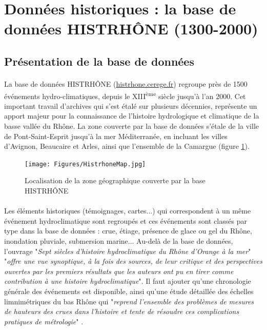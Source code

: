 \documentclass[11pt]{article}
\begin{document}
\FloatBarrier

\section{Données historiques : la base de données HISTRHÔNE (1300-2000)}
\label{sec:HISTRHONE}
	\subsection{Présentation de la base de données}

	\paragraph{} La base de données HISTRHÔNE (\url{histrhone.cerege.fr}) \citep{pichard_sept_2014} regroupe près de 1500 événements hydro-climatiques, depuis le XIII\textsuperscript{ème} siècle jusqu'à l'an 2000. Cet important travail d'archives qui s'est étalé sur plusieurs décennies, représente un apport majeur pour la connaissance de l'histoire hydrologique et climatique de la basse vallée du Rhône. La zone couverte par la base de données s'étale de la ville de Pont-Saint-Esprit jusqu'à la mer Méditerranée, en incluant les villes d'Avignon, Beaucaire et Arles, ainsi que l'ensemble de la Camargue (figure \ref{fig:MapHistrhone}). 
	
	\begin{figure}[h]
	\centering
		\texttt{[image: Figures/HistrhoneMap.jpg]}
        \caption{Localisation de la zone géographique couverte par la base HISTRHÔNE \citep{pichard_sept_2014} }
		\label{fig:MapHistrhone}
	\end{figure}
	
	\paragraph{} Les éléments historiques (témoignages, cartes...) qui correspondent à un même événement hydroclimatique sont regroupés et ces événements sont classés par type dans la base de données : crue, étiage, présence de glace ou gel du Rhône, inondation pluviale, submersion marine... Au-delà de la base de données, l'ouvrage "\textit{Sept siècles d'histoire hydroclimatique du Rhône d'Orange à la mer}" \citep{pichard_sept_2014} "\textit{offre une vue synoptique, à la fois des sources, de leur critique et des perspectives ouvertes par les premiers résultats que les auteurs ont pu en tirer comme contribution à une histoire hydroclimatique}". Il faut ajouter qu'une chronologie générale des événements est disponible, ainsi qu'une étude détaillée des échelles limnimétriques du bas Rhône qui "\textit{reprend l'ensemble des problèmes de mesures de hauteurs des crues dans l'histoire et tente de résoudre ces complications pratiques de métrologie}" \citep{pichard_hauteurs_2013} .
	
\end{document}
